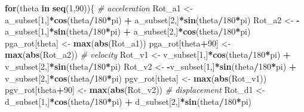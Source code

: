 \documentclass[]{article}
\newenvironment{Shaded}{\begin{snugshade}}{\end{snugshade}}
\newcommand{\KeywordTok}[1]{\textcolor[rgb]{0.13,0.29,0.53}{\textbf{#1}}}
\newcommand{\DecValTok}[1]{\textcolor[rgb]{0.00,0.00,0.81}{#1}}
\newcommand{\StringTok}[1]{\textcolor[rgb]{0.31,0.60,0.02}{#1}}
\newcommand{\CommentTok}[1]{\textcolor[rgb]{0.56,0.35,0.01}{\textit{#1}}}
\newcommand{\ControlFlowTok}[1]{\textcolor[rgb]{0.13,0.29,0.53}{\textbf{#1}}}
\newcommand{\OperatorTok}[1]{\textcolor[rgb]{0.81,0.36,0.00}{\textbf{#1}}}
\newcommand{\NormalTok}[1]{#1}
\begin{document}
\begin{Shaded}
\begin{Highlighting}[]
{  \ControlFlowTok{for}\NormalTok{(theta }\ControlFlowTok{in} \KeywordTok{seq}\NormalTok{(}\DecValTok{1}\NormalTok{,}\DecValTok{90}\NormalTok{))\{}
    \CommentTok{# acceleration}
\NormalTok{    Rot_a1 <-}\StringTok{ }\NormalTok{a_subset[}\DecValTok{1}\NormalTok{,]}\OperatorTok{*}\KeywordTok{cos}\NormalTok{(theta}\OperatorTok{/}\DecValTok{180}\OperatorTok{*}\NormalTok{pi) }\OperatorTok{+}\StringTok{ }\NormalTok{a_subset[}\DecValTok{2}\NormalTok{,]}\OperatorTok{*}\KeywordTok{sin}\NormalTok{(theta}\OperatorTok{/}\DecValTok{180}\OperatorTok{*}\NormalTok{pi)}
\NormalTok{    Rot_a2 <-}\StringTok{ }\OperatorTok{-}\NormalTok{a_subset[}\DecValTok{1}\NormalTok{,]}\OperatorTok{*}\KeywordTok{sin}\NormalTok{(theta}\OperatorTok{/}\DecValTok{180}\OperatorTok{*}\NormalTok{pi) }\OperatorTok{+}\StringTok{ }\NormalTok{a_subset[}\DecValTok{2}\NormalTok{,]}\OperatorTok{*}\KeywordTok{cos}\NormalTok{(theta}\OperatorTok{/}\DecValTok{180}\OperatorTok{*}\NormalTok{pi)}
\NormalTok{    pga_rot[theta] <-}\StringTok{ }\KeywordTok{max}\NormalTok{(}\KeywordTok{abs}\NormalTok{(Rot_a1))}
\NormalTok{    pga_rot[theta}\OperatorTok{+}\DecValTok{90}\NormalTok{] <-}\StringTok{ }\KeywordTok{max}\NormalTok{(}\KeywordTok{abs}\NormalTok{(Rot_a2))}
    \CommentTok{# velocity}
\NormalTok{    Rot_v1 <-}\StringTok{ }\NormalTok{v_subset[}\DecValTok{1}\NormalTok{,]}\OperatorTok{*}\KeywordTok{cos}\NormalTok{(theta}\OperatorTok{/}\DecValTok{180}\OperatorTok{*}\NormalTok{pi) }\OperatorTok{+}\StringTok{ }\NormalTok{v_subset[}\DecValTok{2}\NormalTok{,]}\OperatorTok{*}\KeywordTok{sin}\NormalTok{(theta}\OperatorTok{/}\DecValTok{180}\OperatorTok{*}\NormalTok{pi)}
\NormalTok{    Rot_v2 <-}\StringTok{ }\OperatorTok{-}\NormalTok{v_subset[}\DecValTok{1}\NormalTok{,]}\OperatorTok{*}\KeywordTok{sin}\NormalTok{(theta}\OperatorTok{/}\DecValTok{180}\OperatorTok{*}\NormalTok{pi) }\OperatorTok{+}\StringTok{ }\NormalTok{v_subset[}\DecValTok{2}\NormalTok{,]}\OperatorTok{*}\KeywordTok{cos}\NormalTok{(theta}\OperatorTok{/}\DecValTok{180}\OperatorTok{*}\NormalTok{pi)}
\NormalTok{    pgv_rot[theta] <-}\StringTok{ }\KeywordTok{max}\NormalTok{(}\KeywordTok{abs}\NormalTok{(Rot_v1))}
\NormalTok{    pgv_rot[theta}\OperatorTok{+}\DecValTok{90}\NormalTok{] <-}\StringTok{ }\KeywordTok{max}\NormalTok{(}\KeywordTok{abs}\NormalTok{(Rot_v2))}
    \CommentTok{# displacement}
\NormalTok{    Rot_d1 <-}\StringTok{ }\NormalTok{d_subset[}\DecValTok{1}\NormalTok{,]}\OperatorTok{*}\KeywordTok{cos}\NormalTok{(theta}\OperatorTok{/}\DecValTok{180}\OperatorTok{*}\NormalTok{pi) }\OperatorTok{+}\StringTok{ }\NormalTok{d_subset[}\DecValTok{2}\NormalTok{,]}\OperatorTok{*}\KeywordTok{sin}\NormalTok{(theta}\OperatorTok{/}\DecValTok{180}\OperatorTok{*}\NormalTok{pi)}
}
\end{Highlighting}
\end{Shaded}
\end{document}
